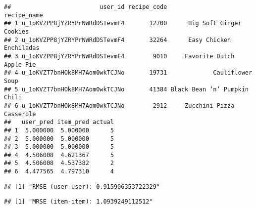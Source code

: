 \documentclass[
]{article}
\newenvironment{Shaded}{\begin{snugshade}}{\end{snugshade}}
\newcommand{\AttributeTok}[1]{\textcolor[rgb]{0.13,0.29,0.53}{#1}}
\newcommand{\CommentTok}[1]{\textcolor[rgb]{0.56,0.35,0.01}{\textit{#1}}}
\newcommand{\ConstantTok}[1]{\textcolor[rgb]{0.56,0.35,0.01}{#1}}
\newcommand{\DecValTok}[1]{\textcolor[rgb]{0.00,0.00,0.81}{#1}}
\newcommand{\FunctionTok}[1]{\textcolor[rgb]{0.13,0.29,0.53}{\textbf{#1}}}
\newcommand{\NormalTok}[1]{#1}
\newcommand{\SpecialCharTok}[1]{\textcolor[rgb]{0.81,0.36,0.00}{\textbf{#1}}}
\newcommand{\StringTok}[1]{\textcolor[rgb]{0.31,0.60,0.02}{#1}}
\begin{document}
\begin{verbatim}
##                         user_id recipe_code                  recipe_name
## 1 u_1oKVZPP8jYZRYPrNWRdDSTevmF4       12700      Big Soft Ginger Cookies
## 2 u_1oKVZPP8jYZRYPrNWRdDSTevmF4       32264      Easy Chicken Enchiladas
## 3 u_1oKVZPP8jYZRYPrNWRdDSTevmF4        9010     Favorite Dutch Apple Pie
## 4 u_1oKVZT7bnHOk8MH7Aom0wkTCJNo       19731             Cauliflower Soup
## 5 u_1oKVZT7bnHOk8MH7Aom0wkTCJNo       41384 Black Bean ‘n’ Pumpkin Chili
## 6 u_1oKVZT7bnHOk8MH7Aom0wkTCJNo        2912     Zucchini Pizza Casserole
##   user_pred item_pred actual
## 1  5.000000  5.000000      5
## 2  5.000000  5.000000      5
## 3  5.000000  5.000000      5
## 4  4.506008  4.621367      5
## 5  4.506008  4.537382      2
## 6  4.477565  4.797310      4
\end{verbatim}

\begin{Shaded}
\end{Shaded}

\begin{verbatim}
## [1] "RMSE (user-user): 0.915906353722329"
\end{verbatim}

\begin{Shaded}
\end{Shaded}

\begin{verbatim}
## [1] "MRSE (item-item): 1.0939249112512"
\end{verbatim}
\end{document}
